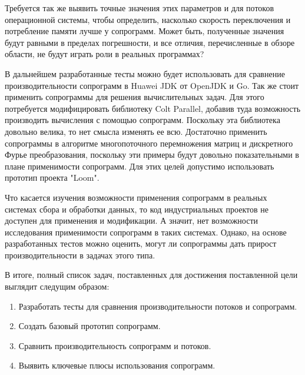 	Требуется так же выявить точные значения этих параметров и для потоков операционной
	системы, чтобы определить, насколько скорость переключения и потребление памяти лучше
	у сопрограмм. Может быть, полученные значения будут равными в пределах погрешности,
	и все отличия, перечисленные в обзоре области, не будут играть роли в реальных программах?
	\par
	В дальнейшем разработанные тесты можно будет использовать для сравнение производительности сопрограмм в
	Huawei JDK от OpenJDK и Go. Так же стоит применить сопрограммы для решения вычислительных задач.
	Для этого потребуется модифицировать библиотеку Colt Parallel, добавив туда возможность производить
	вычисления с помощью сопрограмм. Поскольку эта библиотека довольно велика, то нет смысла
	изменять ее всю. Достаточно применить сопрограммы в алгоритме многопоточного перемножения
	матриц и дискретного Фурье преобразования, поскольку эти примеры будут довольно показательными в плане
	применимости сопрограмм. Для этих целей допустимо использовать прототип проекта "Loom".
	\par
	Что касается изучения возможности применения сопрограмм в реальных системах сбора и обработки данных,
	то код индустриальных проектов не доступен для применения и модификации. А значит, нет возможности
	исследования применимости сопрограмм в таких системах. Однако, на основе разработанных тестов
	можно оценить, могут ли сопрограммы дать прирост производительности в задачах этого типа. 
	  
	В итоге, полный список задач, поставленных для достижения поставленной цели выглядит следущим образом:
	\begin{enumerate}[align=left]
	  	\item Разработать тесты для сравнения производительности потоков и сопрограмм.
	  	\item Создать базовый прототип сопрограмм.
	  	\item Сравнить производительность сопрограмм и потоков.
	  	\item Выявить ключевые плюсы использования сопрограмм.
	\end{enumerate}
\clearpage